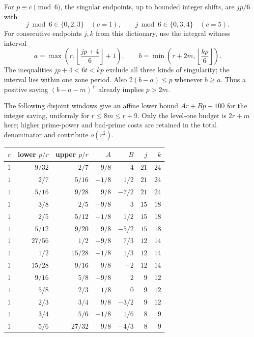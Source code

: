 For $p\equiv c\pmod6$, the singular endpoints, up to bounded integer
shifts, are $jp/6$ with
\[
 j\bmod6\in\{0,2,3\}\quad(c=1),\qquad
 j\bmod6\in\{0,3,4\}\quad(c=5).
\]
For consecutive endpoints $j,k$ from this dictionary, use the integral
witness interval
\[
 a=\max\!\left(r,\left\lfloor\frac{jp+4}{6}\right\rfloor+1\right),
 \qquad b=\min\!\left(r+2m,\left\lfloor\frac{kp}{6}\right\rfloor\right).
\]
The inequalities $jp+4<6t<kp$ exclude all three kinds of singularity;
the interval lies within one zone period. Also $2(b-a)\le p$ whenever
$b\ge a$. Thus a positive saving $(b-a-m)^+$ already implies $p>2m$.

The following disjoint windows give an affine lower bound
$Ar+Bp-100$ for the integer saving, uniformly for $r\le8m\le r+9$.
Only the level-one budget is $2r+m$ here; higher prime-power and bad-prime
costs are retained in the total denominator and contribute $o(r^2)$.
\begin{center}
\begin{tabular}{crrrrrr}
\toprule
$c$ & lower $p/r$ & upper $p/r$ & $A$ & $B$ & $j$ & $k$\\
\midrule
$1$ & $9/32$ & $2/7$ & $-9/8$ & $4$ & $21$ & $24$\\
$1$ & $2/7$ & $5/16$ & $-1/8$ & $1/2$ & $21$ & $24$\\
$1$ & $5/16$ & $9/28$ & $9/8$ & $-7/2$ & $21$ & $24$\\
$1$ & $3/8$ & $2/5$ & $-9/8$ & $3$ & $15$ & $18$\\
$1$ & $2/5$ & $5/12$ & $-1/8$ & $1/2$ & $15$ & $18$\\
$1$ & $5/12$ & $9/20$ & $9/8$ & $-5/2$ & $15$ & $18$\\
$1$ & $27/56$ & $1/2$ & $-9/8$ & $7/3$ & $12$ & $14$\\
$1$ & $1/2$ & $15/28$ & $-1/8$ & $1/3$ & $12$ & $14$\\
$1$ & $15/28$ & $9/16$ & $9/8$ & $-2$ & $12$ & $14$\\
$1$ & $9/16$ & $5/8$ & $-9/8$ & $2$ & $9$ & $12$\\
$1$ & $5/8$ & $2/3$ & $1/8$ & $0$ & $9$ & $12$\\
$1$ & $2/3$ & $3/4$ & $9/8$ & $-3/2$ & $9$ & $12$\\
$1$ & $3/4$ & $5/6$ & $-1/8$ & $1/6$ & $8$ & $9$\\
$1$ & $5/6$ & $27/32$ & $9/8$ & $-4/3$ & $8$ & $9$\\
\bottomrule
\end{tabular}
\end{center}
